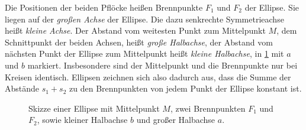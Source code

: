 \documentclass{scrartcl}
\begin{document}
        \noindent Die Positionen der beiden Pflöcke heißen Brennpunkte $F_1$ und $F_2$ der Ellipse.
        Sie liegen auf der \emph{großen Achse} der Ellipse.
        Die dazu senkrechte Symmetrieachse heißt \emph{kleine Achse}.
        Der Abstand vom weitesten Punkt zum Mittelpunkt $M$, dem Schnittpunkt der beiden Achsen, heißt \emph{große Halbachse}, der Abstand vom nächsten Punkt der Ellipse zum Mittelpunkt heißt \emph{kleine Halbachse}, in \cref{fig:Ellipse} mit $a$ und $b$ markiert.
        Insbesondere sind der Mittelpunkt und die Brennpunkte nur bei Kreisen identisch.
        Ellipsen zeichnen sich also dadurch aus, dass die Summe der Abstände $s_1+s_2$ zu den Brennpunkten von jedem Punkt der Ellipse konstant ist.

        \begin{figure}[ht]
        \centering
        \caption{Skizze einer Ellipse mit Mittelpunkt $M$, zwei Brennpunkten $F_1$ und $F_2$, sowie kleiner Halbachse $b$ und großer Halbachse $a$.}
        \label{fig:Ellipse}
        \end{figure}
\end{document}
